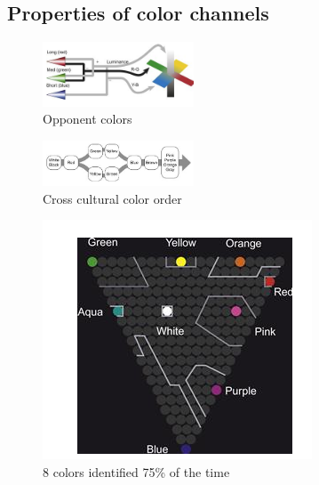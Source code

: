 \begin{mdframed}\begin{multicols}{2}
\subsection{Properties of color channels}
\begin{figure}[H]
\centering
\includegraphics[width=0.4\textwidth]{opponents.png}
\caption{Opponent colors}
\end{figure}

\begin{figure}[H]
\centering
\includegraphics[width=0.4\textwidth]{color_order.png}
\caption{Cross cultural color order}
\end{figure}
\begin{figure}[H]
\centering
\includegraphics[width=0.6\linewidth]{accurately_identified.png}
\caption{8 colors identified 75\% of the time}
\end{figure}



\end{multicols}\end{mdframed}


